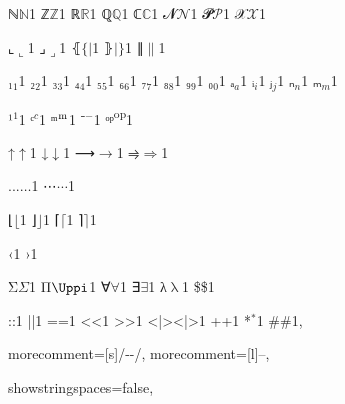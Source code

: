 {{ℕ}{{\ensuremath{\mathbb{N}}}}1
{ℤ}{{\ensuremath{\mathbb{Z}}}}1
{ℝ}{{\ensuremath{\mathbb{R}}}}1
{ℚ}{{\ensuremath{\mathbb{Q}}}}1
{ℂ}{{\ensuremath{\mathbb{C}}}}1
{𝓝}{{\ensuremath{\mathcal{N}}}}1
{𝓟}{{\ensuremath{\mathcal{P}}}}1
{𝒳}{{\ensuremath{\mathcal{X}}}}1

{⌞}{{\ensuremath{\llcorner}}}1
{⌟}{{\ensuremath{\lrcorner}}}1
{⦃}{{\ensuremath{\{\!|}}}1
{⦄}{{\ensuremath{|\!\}}}}1
{∥}{{\ensuremath{\|}}}1

{₁}{{\ensuremath{_1}}}1
{₂}{{\ensuremath{_2}}}1
{₃}{{\ensuremath{_3}}}1
{₄}{{\ensuremath{_4}}}1
{₅}{{\ensuremath{_5}}}1
{₆}{{\ensuremath{_6}}}1
{₇}{{\ensuremath{_7}}}1
{₈}{{\ensuremath{_8}}}1
{₉}{{\ensuremath{_9}}}1
{₀}{{\ensuremath{_0}}}1
{ₐ}{{\ensuremath{_a}}}1
{ᵢ}{{\ensuremath{_i}}}1
{ⱼ}{{\ensuremath{_j}}}1
{ₙ}{{\ensuremath{_n}}}1
{ₘ}{{\ensuremath{_m}}}1

{¹}{{\ensuremath{^1}}}1
{ᶜ}{{\color{symbolcolor}\ensuremath{^c}}}1
{ᵐ}{{\color{symbolcolor}\ensuremath{\textsuperscript{m}}}}1
{⁻}{{\ensuremath{^{-}}}}1
{ᵒᵖ}{{\color{symbolcolor}\textsuperscript{op}}}1

{↑}{{\color{symbolcolor}\ensuremath{\uparrow}}}1
{↓}{{\color{symbolcolor}\ensuremath{\downarrow}}}1
{⟶}{{\color{symbolcolor}\ensuremath{\longrightarrow}}}1
{⥤}{{\color{symbolcolor}\ensuremath{\Rightarrow}}}1

{...}{{\ensuremath{\ldots}}}1
{⋯}{{\color{symbolcolor}\ensuremath{\cdots}}}1

{⌊}{{\ensuremath{\lfloor}}}1
{⌋}{{\ensuremath{\rfloor}}}1
{⌈}{{\ensuremath{\lceil}}}1
{⌉}{{\ensuremath{\rceil}}}1

{‹}{{\guilsinglleft}}1
{›}{{\guilsinglright}}1

{Σ}{{\color{symbolcolor}\ensuremath{\Sigma}}}1
{Π}{{\color{symbolcolor}\ensuremath{\Uppi}}}1 %
{∀}{{\color{symbolcolor}\ensuremath{\forall}}}1
{∃}{{\color{symbolcolor}\ensuremath{\exists}}}1
{λ}{{\color{symbolcolor}\ensuremath{\uplambda}}}1
{\$}{{\color{symbolcolor}\$}}1

{:}{{\color{symbolcolor}:}}1
{|}{{\color{symbolcolor}|}}1
{=}{{\color{symbolcolor}=}}1
{<}{{\color{symbolcolor}<}}1
{>}{{\color{symbolcolor}>}}1
{<|>}{{\color{symbolcolor}<|>}}1
{+}{{\color{symbolcolor}+}}1
{*}{{\color{symbolcolor}\ensuremath{{}^{*}}}}1
{\#}{{\color{keywordcolor}\#}}1, %

morecomment=[s]{/-}{-/},
morecomment=[l]{--},

showstringspaces=false,

}
